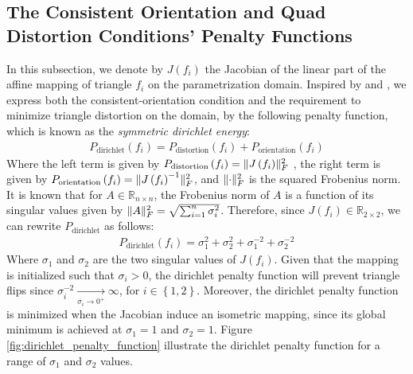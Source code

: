 \subsection{The Consistent Orientation and Quad Distortion Conditions' Penalty Functions}
In this subsection, we denote by $J\left(f_i\right)$ the Jacobian of the linear part of the affine mapping of triangle $f_i$ on the parametrization domain. Inspired by \cite{Smith:2015} and \cite{Poranne:Autocuts:2017}, we express both the consistent-orientation condition and the requirement to minimize triangle distortion on the domain, by the following penalty function, which is known as the \emph{symmetric dirichlet energy}:
\begin{equation}\label{eq:orientation_and_distortion_penalty}
\begin{split}
P_{\mathrm{dirichlet}}\left(f_i\right) = P_{\mathrm{distortion}}\left(f_i\right) + P_{\mathrm{orientation}}\left(f_i\right)
\end{split}
\end{equation}
Where the left term is given by $P_{\mathrm{distortion}}\left(f_i\right) = \lVert J\left(f_i\right)\rVert_F^2$ , the right term is given by $P_{\mathrm{orientation}}\left(f_i\right) = \lVert J\left(f_i\right)^{-1}\rVert_F^2$, and $\lVert\cdot\rVert_F^2$ is the squared Frobenius norm. It is known that for $A \in \mathbb{R}_{n \times n}$, the Frobenius norm of $A$ is a function of its singular values given by $\lVert A\rVert_F^2 = \sqrt{\sum_{i=1}^{n} \sigma_i^2}$. Therefore, since $J\left(f_i\right) \in \mathbb{R}_{2 \times 2}$, we can rewrite $P_{\mathrm{dirichlet}}$ as follows:
\begin{equation}\label{eq:orientation_and_distortion_penalty_explicit}
\begin{split}
P_{\mathrm{dirichlet}}\left(f_i\right) = \sigma^2_1 + \sigma^2_2 + \sigma^{-2}_1 +\sigma^{-2}_2
\end{split}
\end{equation}
Where $\sigma_1$ and $\sigma_2$ are the two singular values of $J\left(f_i\right)$. Given that the mapping is initialized such that $\sigma_i > 0$, the dirichlet penalty function will prevent triangle flips since $\sigma^{-2}_i \xrightarrow[\sigma_i \to 0^+]{} \infty$, for $i \in \left\{1,2\right\}$. Moreover, the dirichlet penalty function is minimized when the Jacobian induce an isometric mapping, since its global minimum is achieved at $\sigma_1 = 1$ and $\sigma_2 = 1$. Figure \ref{fig:dirichlet_penalty_function} illustrate the dirichlet penalty function for a range of $\sigma_1$ and $\sigma_2$ values.
